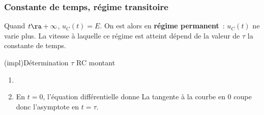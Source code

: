 \documentclass[../../main/main.tex]{subfiles}
\begin{document}
\subsubsection{Constante de temps, régime transitoire}
Quand $t \ra +\infty$, $u_C(t) = E$. On est alors en \textbf{régime permanent}~:
$u_C(t)$ ne varie plus. La vitesse à laquelle ce régime est atteint dépend de la
valeur de $\tau$ la constante de temps.
  \begin{tcb*}[label=impl:déterm, sidebyside, righthand ratio=.4]
    (impl){Détermination $\tau$ RC montant}
    \begin{enumerate}
      \item {}%
      \item En $t=0$, l'équation différentielle donne
            La tangente à la courbe en 0 coupe donc l'asymptote en $\boxed{t =
            \tau}$.
    \end{enumerate}
    \tcblower
\end{tcb*}
\end{document}

